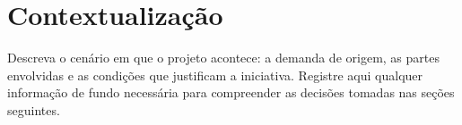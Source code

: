 \section{Contextualização}

Descreva o cenário em que o projeto acontece: a demanda de origem, as partes
envolvidas e as condições que justificam a iniciativa. Registre aqui qualquer
informação de fundo necessária para compreender as decisões tomadas nas seções
seguintes.
